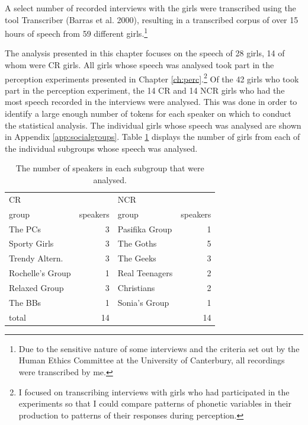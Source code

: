 A select number of recorded interviews with the girls were transcribed using the tool Transcriber (Barras et al. 2000), resulting in a transcribed corpus of over 15 hours of speech from 59 different girls.\footnote{Due to the sensitive nature of some interviews and the criteria set out by the Human Ethics Committee at the University of Canterbury, all recordings were transcribed by me.}  
\nocite{Transcriber-SpeechComm2000}

The analysis presented in this chapter focuses on the speech of 28 girls, 14 of whom were CR girls.  All girls whose speech was analysed took part in the perception experiments presented in Chapter \ref{ch:perc}.\footnote{I focused on transcribing interviews with girls who had participated in the experiments so that I could compare patterns of phonetic variables in their production to patterns of their responses during perception.}  Of the 42 girls who took part in the perception experiment, the 14 CR and 14 NCR girls who had the most speech recorded in the interviews were analysed. This was done in order to identify a large enough number of tokens for each speaker on which to conduct the statistical analysis.   The individual girls whose speech was analysed are shown in Appendix \ref{app:socialgroups}.   Table \ref{tab:groupsprod} displays the number of girls from each of the individual subgroups whose speech was analysed.

\begin{table}[htbp]
\caption{The number of speakers in each subgroup that were analysed.}	
	\label{tab:groupsprod}
	 \begin{center}
		\begin{tabular}{lrlr}\hline
	
CR & &NCR&  \\
   group & speakers & group & speakers \\
  \hline
The PCs & 3      &Pasifika Group & 1  \\
Sporty Girls & 3  &The Goths & 5 \\
Trendy Altern. & 3  &The Geeks & 3  \\
Rochelle's Group & 1   &Real Teenagers & 2 \\
Relaxed Group & 3      &Christians & 2 \\
The BBs & 1        &Sonia's Group & 1  \\
total & 14  & & 14  \\

\hline
		\end{tabular}
	
	\end{center}
\end{table} 


